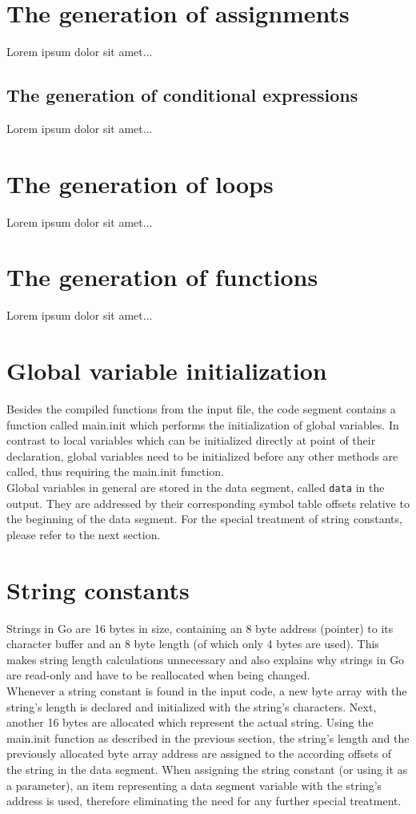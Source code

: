 \documentclass[a4paper]{scrreprt}
\begin{document}
    \section{The generation of assignments}
      Lorem ipsum dolor sit amet...

    \subsection{The generation of conditional expressions}
      Lorem ipsum dolor sit amet...

    \section{The generation of loops}
      Lorem ipsum dolor sit amet...

    \section{The generation of functions} \label{The generation of functions}
      Lorem ipsum dolor sit amet...

    \section{Global variable initialization}
        Besides the compiled functions from the input file, the code segment contains a function called main.init which performs the initialization of global variables. In contrast to local variables which can be initialized directly at point of their declaration, global variables need to be initialized before any other methods are called, thus requiring the main.init function.\\
        Global variables in general are stored in the data segment, called \texttt{data} in the output. They are addressed by their corresponding symbol table offsets relative to the beginning of the data segment. For the special treatment of string constants, please refer to the next section.

    \section{String constants} \label{String constants}
        Strings in Go are 16 bytes in size, containing an 8 byte address (pointer) to its character buffer and an 8 byte length (of which only 4 bytes are used). This makes string length calculations unnecessary and also explains why strings in Go are read-only and have to be reallocated when being changed.\\
        Whenever a string constant is found in the input code, a new byte array with the string's length is declared and initialized with the string's characters. Next, another 16 bytes are allocated which represent the actual string. Using the main.init function as described in the previous section, the string's length and the previously allocated byte array address are assigned to the according offsets of the string in the data segment. When assigning the string constant (or using it as a parameter), an item representing a data segment variable with the string's address is used, therefore eliminating the need for any further special treatment.
\end{document}
